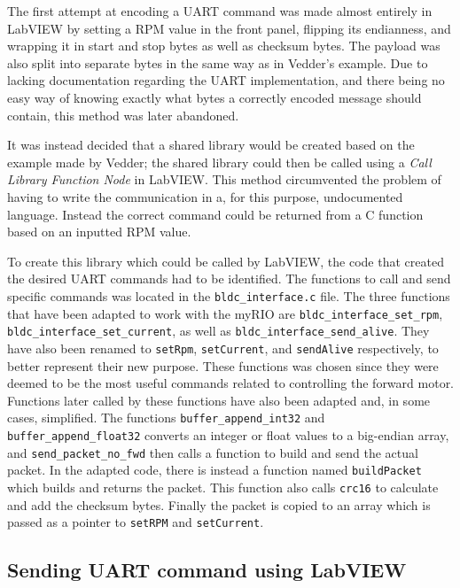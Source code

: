 The first attempt at encoding a UART command was made almost entirely in LabVIEW by setting a RPM value in the front panel, flipping its endianness, and wrapping it in start and stop bytes as well as checksum bytes. The payload was also split into separate bytes in the same way as in Vedder's example. Due to lacking documentation regarding the UART implementation, and there being no easy way of knowing exactly what bytes a correctly encoded message should contain, this method was later abandoned.

It was instead decided that a shared library would be created based on the example made by Vedder; the shared library could then be called using a \textit{Call Library Function Node} in LabVIEW. This method circumvented the problem of having to write the communication in a, for this purpose, undocumented language. Instead the correct command could be returned from a C function based on an inputted RPM value. 

To create this library which could be called by LabVIEW, the code that created the desired UART commands had to be identified. The functions to call and send specific commands was located in the \texttt{bldc\_interface.c} file. The three functions that have been adapted to work with the myRIO are \texttt{bldc\_interface\_set\_rpm}, \texttt{bldc\_interface\_set\_current}, as well as  \texttt{bldc\_interface\_send\_alive}. They have also been renamed to \texttt{setRpm}, \texttt{setCurrent}, and \texttt{sendAlive} respectively, to better represent  their new purpose. These functions was chosen since they were deemed to be the most useful commands related to controlling the forward motor. Functions later called by these functions have also been adapted and, in some cases, simplified. The functions \texttt{buffer\_append\_int32} and \texttt{buffer\_append\_float32} converts an integer or float values to a big-endian array, and \texttt{send\_packet\_no\_fwd} then calls a function to build and send the actual packet. In the adapted code, there is instead a function named \texttt{buildPacket} which builds and returns the packet. This function also calls \texttt{crc16} to calculate and add the checksum bytes. Finally the packet is copied to an array which is passed as a pointer to \texttt{setRPM} and \texttt{setCurrent}.

\subsection{Sending UART command using LabVIEW}

